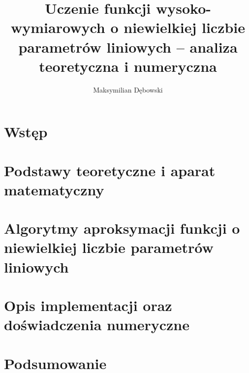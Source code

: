 \documentclass[12pt,a4paper]{article}
\title{Uczenie funkcji wysoko-wymiarowych o niewielkiej liczbie parametrów liniowych – analiza teoretyczna i numeryczna}
\author{Maksymilian Dębowski}
\date{\the\year} %
\theoremstyle{definition}
\begin{document}
\maketitle

\section*{Wstęp}



\section{Podstawy teoretyczne i aparat matematyczny}





\section{Algorytmy aproksymacji funkcji o niewielkiej liczbie parametrów liniowych}









\section{Opis implementacji oraz doświadczenia numeryczne}








\newpage

\section{Podsumowanie}


\newpage




\end{document}
